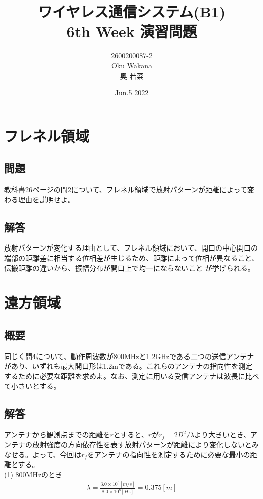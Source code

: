 \documentclass[dvipdfmx,autodetect-engine,titlepage]{jsarticle}
\title{ワイヤレス通信システム(B1)\\
6th Week 演習問題\\
}
\author{2600200087-2\\Oku Wakana\\奥 若菜}
\date{Jun.5 2022}
\begin{document}
\maketitle

\section{フレネル領域}
\subsection{問題}
教科書26ページの問2について、フレネル領域で放射パターンが距離によって変わる理由を説明せよ。
\subsection{解答}
放射パターンが変化する理由として、フレネル領域において、開口の中心開口の端部の距離差に相当する位相差が生じるため、距離によって位相が異なること、伝搬距離の違いから、振幅分布が開口上で均一にならないこと
が挙げられる。\\


\section{遠方領域}
\subsection{概要}
同じく問4について、動作周波数が800MHzと1.2GHzである二つの送信アンテナがあり、いずれも最大開口形は1.2mである。これらのアンテナの指向性を測定するために必要な距離を求めよ。なお、測定に用いる受信アンテナは波長に比べて小さいとする。

\subsection{解答}
アンテナから観測点までの距離を\begin{math}r\end{math}とすると、\begin{math}
  rが r_f=2D^2/ \lambda 
\end{math}より大きいとき、アンテナの放射強度の方向依存性を表す放射パターンが距離により変化しないとみなせる。よって、今回は\begin{math}
  r_f
\end{math}をアンテナの指向性を測定するために必要な最小の距離とする。\\

(1) 800MHzのとき
\begin{eqnarray*}
  \lambda = \frac{3.0 \times  10^8 [m/s]}{8.0 \times  10^8 [Hz]}
  = 0.375 [m]
\end{eqnarray*}
\end{document}
